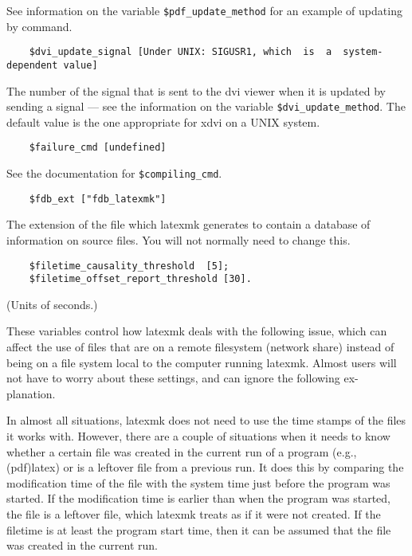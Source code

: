 See  information on the variable \verb|$pdf_update_method| for an example of updating by command.

\begin{verbatim}
	$dvi_update_signal [Under UNIX: SIGUSR1, which  is  a  system-dependent value]
\end{verbatim}

The  number of the signal that is sent to the dvi viewer when it is updated by
sending a signal --- see  the  information  on  the variable
\verb|$dvi_update_method|.   The default value is the one appropriate for xdvi
on a UNIX system.

\begin{verbatim}
	$failure_cmd [undefined]
\end{verbatim}

See the documentation for \verb|$compiling_cmd|.

\begin{verbatim}
	$fdb_ext ["fdb_latexmk"]
\end{verbatim}

The extension of the file which latexmk generates to  contain  a
database  of information on source files.  You will not normally
need to change this.

\begin{verbatim}
	$filetime_causality_threshold  [5];   
	$filetime_offset_report_threshold [30]. 
\end{verbatim}

(Units of seconds.)

These variables control how latexmk deals with the following issue, which can
affect the use of files  that  are  on  a  remote filesystem (network share)
instead of being on a file system local to the computer running latexmk.
Almost users will not have to  worry about these settings, and can ignore the
following ex- planation.

In almost all situations, latexmk does not need to use the  time stamps  of the
files it works with.  However, there are a couple of situations when it needs
to know whether a certain  file  was created in the current run of a program
(e.g., (pdf)latex) or is a leftover file from a previous run. It does this  by
comparing the  modification time of the file with the system time just before
the program was started. If the modification time  is  earlier  than  when
the program was started, the file is a leftover file, which latexmk treats as
if it were not  created.   If  the filetime  is at least the program start
time, then it can be assumed that the file was created in the current run.


